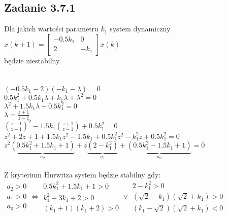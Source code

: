 \subsection*{Zadanie 3.7.1} {\color{darkgray}
	Dla jakich wartości parametru $k_1$ system dynamiczny\\
	$x(k+1)=\left[ \begin{array}{cc}     -0.5k_1&0\\2&-k_1    \end{array}\right]x(k)$\\
	będzie niestabilny.\\
}\lineh
\\\\
$(-0.5k_1-2)(-k_1-\lambda)=0$\\
$0.5k_1^2+0.5k_1\lambda+k_1\lambda+\lambda^2=0$\\
$\lambda^2+1.5k_1\lambda+0.5k_1^2=0$\\
$\lambda=\frac{z+1}{z-1}$\\
$(\frac{z+1}{z-1})^2-1.5k_1(\frac{z+1}{z-1})+0.5k_1^2=0$\\
$z^2+2z+1+1.5k_1z^2-1.5k_1+0.5k_1^2z^2-k_1^2z+0.5k_1^2=0$\\
$z^2\underbrace{(0.5k_1^2+1.5k_1+1)}_{a_2}+z\underbrace{(2-k_1^2)}_{a_1}+\underbrace{(0.5k_1^2-1.5k_1+1)}_{a_0}=0$\\\\
Z kryterium Hurwitza system będzie stabilny gdy:\\
 $\begin{array}{c}   a_2>0 \\ a_1>0 \\ a_0>0    \end{array} 
\Leftrightarrow  \begin{array}{r} 
	0.5k_1^2+1.5k_1+1>0 \\ 
	k_1^2+3k_1+2>0 \\
 	(k_1+1)(k_1+2)>0 
\end{array}   
\vee \begin{array}{r}
	2-k_1^2>0 \\
	(\sqrt{2}-k_1)(\sqrt{2}+k_1)>0\\
	(k_1-\sqrt{2})(\sqrt{2}+k_1)<0
\end{array}$
